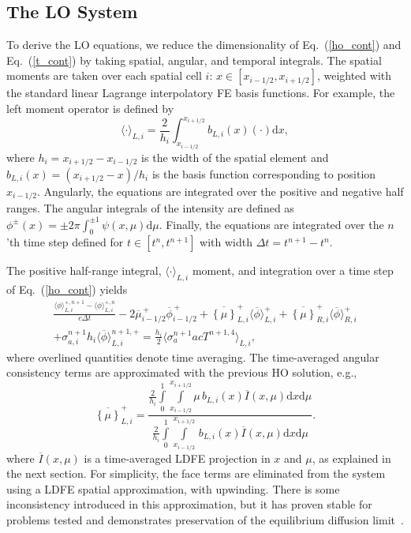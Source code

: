 \documentclass{anstrans}
\renewcommand{\eqref}[1]{(\ref{#1})}
\renewcommand{\d}{\mathrm{d}}
\newcommand{\mom}[1]{\langle #1 \rangle}
\newcommand{\xl}{{x_{i-1/2}}}
\newcommand{\xr}{{x_{i+1/2}}}
\newcommand{\phibar}{\ensuremath{\overline{\phi}}}
\newcommand{\cur}[1]{\left\{ #1 \right\}}
\begin{document}
\subsection*{The LO System}
\label{sec:lo}

To derive the LO equations, we reduce the dimensionality of Eq.~\eqref{ho_cont} and
Eq.~\eqref{t_cont} by taking spatial, angular, and
temporal integrals.  The spatial moments are taken over each spatial cell $i$:
$x\in[x_{i-1/2},x_{i+1/2}]$, weighted with the standard linear Lagrange interpolatory FE basis functions.  For example, the left moment operator is defined by
\begin{equation}\label{x_mom}
    \mom{\cdot}_{L,i} = \frac{2}{h_i} \int_{x_{i-1/2}}^{\xr} b_{L,i}(x) (\cdot) \d x,
\end{equation}
where $h_i=x_{i+1/2}-x_{i-1/2}$ is the width of the spatial element and
$b_{L,i}(x)=(x_{i+1/2}-x)/h_i$ is the basis function corresponding to position
$x_{i-1/2}$. Angularly, the equations are integrated over the positive and negative half
ranges.  The angular integrals of the intensity are defined as $\phi^\pm(x) = \pm2\pi
\int_0^{\pm 1} \psi(x,\mu) \d \mu$.  Finally, the equations are integrated over the $n$'th
time step defined for 
$t\in[t^n,t^{n+1}]$ with width $\Delta t = t^{n+1}-t^{n}$.  

The positive half-range integral, $\mom{\cdot}_{L,i}$ moment, and
integration over a time step of Eq.~\eqref{ho_cont} yields
\begin{multline}\label{eq:t_moml_ex}
    \frac{\mom{\phi}_{L,i}^{+,n+1} - \mom{\phi}_{L,i}^{+,n}}{c \Delta t}
    -2\overline {\mu}_{i-1/2}^{\,+} \overline \phi_{i-1/2}^{\,+} + \overline{\cur {\mu}}_{L,i}^{+}
  \mom{\phibar}_{L,i}^{+}
  +  \overline{\cur\mu}_{R,i}^{+}
  \mom{\phibar}_{R,i}^{+} \\ +  \sigma_{a,i}^{n+1} h_i 
  \mom{\overline\phi}_{L,i}^{n+1,+}   = \frac{h_i}{2} \mom{\sigma_a^{n+1} a c T^{n+1,4}}_{L,i},
\end{multline}
where overlined quantities denote time averaging.  The time-averaged angular consistency
terms are approximated with the previous HO solution, e.g.,
\begin{equation}\label{const}
    \overline{\cur{{\mu}}}_{L,i}^+ =  \frac{
        {\displaystyle \frac{2}{h_i}} \int\limits_0^1 \int\limits_\xl^\xr \mu \, b_{L,i}(x)
        \overline{I}(x,\mu) \d x \d \mu } 
{{\displaystyle \frac{2}{h_i}} \int\limits_0^1 \int\limits_\xl^\xr \, b_{L,i}(x)
\overline{I}(x,\mu) \d x \d \mu } .
\end{equation}
where $\overline{I}(x,\mu)$ is a time-averaged LDFE projection in $x$ and $\mu$, as
explained in the next section.  For simplicity, the face terms are eliminated from the system using a LDFE
spatial approximation, with upwinding.  There is some inconsistency introduced in this approximation, but
it has proven stable for problems tested and demonstrates preservation of the equilibrium diffusion
limit~\cite{morel_ldtrt}.
\end{document}
